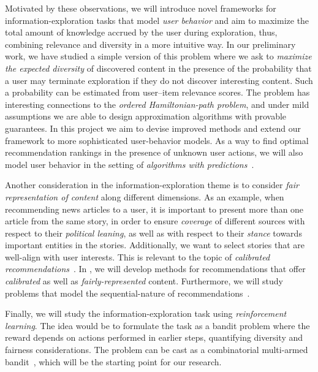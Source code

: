 \documentclass[a4paper,11pt]{article}
\begin{document}
Motivated by these observations, 
we will introduce novel frameworks for information-exploration tasks
that model \emph{user behavior} and aim to maximize 
the total amount of knowledge accrued by the user during exploration, 
thus, combining relevance and diversity in a more intuitive way.
In our preliminary work, we have studied a simple version 
of this problem where we ask to \emph{maximize the expected diversity} of discovered content
in the presence of the probability that a user 
may terminate exploration if they do not discover interesting content.
Such a probability can be estimated from user--item relevance scores.
The problem has interesting connections to the \emph{ordered Hamiltonian-path problem}, 
and under mild assumptions we are able to design approximation algorithms
with provable guarantees.
In this project we aim to devise improved methods
and extend our framework to more sophisticated user-behavior models.
As a way to find optimal recommendation rankings in the presence of unknown user actions, 
we will also model user behavior in the setting of 
\emph{algorithms with predictions}~\cite{mitzenmacher2022algorithms}.

Another consideration in the information-exploration theme
is to consider \emph{fair representation of content} along different dimensions. 
As an example, when recommending news articles to a user, 
it is important to present more than one article from the same story,
in order to ensure \emph{coverage} of different sources with respect to their \emph{political leaning}, 
as well as with respect to their \emph{stance} towards important entities in the stories. 
Additionally, we want to select stories that are well-align with user interests. 
This is relevant to the topic of \emph{calibrated recommendations}~\cite{wang2022improving}.
In \acronym, we will develop methods for recommendations that 
offer \emph{calibrated} as well as \emph{fairly-represented} content.
Furthermore, we will study problems that model the sequential-nature of recommendations~\cite{zhang2022ranking}.

Finally, we will study the information-exploration task using \emph{reinforcement learning}.
The idea would be to formulate the task as a bandit problem
where the reward depends on actions performed in earlier steps, 
quantifying diversity and fairness considerations. 
The problem can be cast as a combinatorial multi-armed bandit~\cite{chen2013combinatorial}, 
which will be the starting point for our research. 
\end{document}
